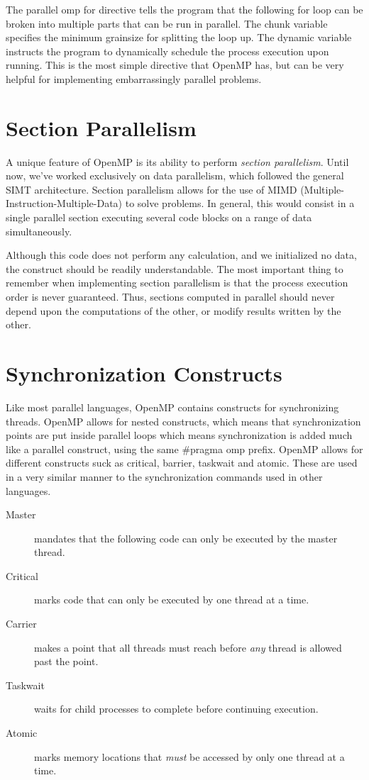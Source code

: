 \documentclass{article}
\newcommand{\comp}[1]{{\ttfamily #1}}
\begin{document}
	The \comp{parallel omp for} directive tells the program that the following \comp{for} loop can be broken into multiple parts that can be run in parallel. The \comp{chunk} variable specifies the minimum grainsize for splitting the loop up. The \comp{dynamic} variable instructs the program to dynamically schedule the process execution upon running. This is the most simple directive that OpenMP has, but can be very helpful for implementing embarrassingly parallel problems.
	
	\section{Section Parallelism}
	A unique feature of OpenMP is its ability to perform \emph{section parallelism}. Until now, we've worked exclusively on data parallelism, which followed the general SIMT architecture. Section parallelism allows for the use of MIMD (Multiple-Instruction-Multiple-Data) to solve problems. In general, this would consist in a single parallel section executing several code blocks on a range of data simultaneously. 
	
		
	
	Although this code does not perform any calculation, and we initialized no data, the construct should be readily understandable. The most important thing to remember when implementing section parallelism is that the process execution order is never guaranteed. Thus, sections computed in parallel should never depend upon the computations of the other, or modify results written by the other.     


    \section{Synchronization Constructs}
    Like most parallel languages, OpenMP contains constructs for synchronizing threads. OpenMP allows for nested constructs, which means that synchronization points are put inside parallel loops which means synchronization is added much like a parallel construct, using the same \comp{\#pragma omp} prefix. OpenMP allows for different constructs suck as \comp{critical}, \comp{barrier}, \comp{taskwait} and \comp{atomic}. These are used in a very similar manner to the synchronization commands used in other languages.
    
    \begin{description}
    	\item[Master] mandates that the following code can only be executed by the master thread.
    	\item[Critical] marks code that can only be executed by one thread at a time.
    	\item[Carrier] makes a point that all threads must reach before \emph{any} thread is allowed past the point.
    	\item[Taskwait] waits for child processes to complete before continuing execution.
    	\item[Atomic] marks memory locations that \emph{must} be accessed by only one thread at a time.
    \end{description}
    
\end{document}
